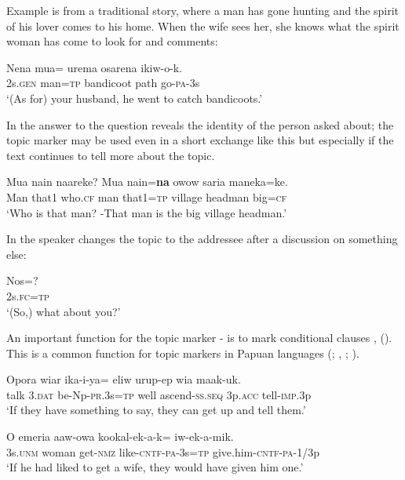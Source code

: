 Example  is from a traditional story, where a man has gone hunting and the spirit of his lover comes to his home. When the wife sees her, she knows what the spirit woman has come to look for and comments:

\ea%
\label{ex:3:x779}
\gll Nena mua= urema osarena ikiw-o-k. \\
2s.\textsc{gen} man=\textsc{tp} bandicoot path go-\textsc{pa}-3s\\
\glt`(As for) your husband, he went to catch bandicoots.'
\z

In  the answer to the question reveals the identity of the person asked about; the topic marker may be used even in a short exchange like this but especially if the text continues to tell more about the topic. 

\ea%
\label{ex:3:x1751}
\gll Mua nain naareke? Mua nain=\textbf{na} owow saria maneka=ke. \\
Man that1 who.\textsc{cf} man that1=\textsc{tp} village headman big=\textsc{cf}\\
\glt`Who is that man? -That man is the big village headman.'
\z

In  the speaker changes the topic to the addressee after a discussion on something else:

\ea%
\label{ex:3:x780}
\gll Nos=? \\
2s.\textsc{fc}=\textsc{tp}\\
\glt`(So,) what about you?'
\z

An important function for the topic marker - is to mark conditional clauses ,  (). This is a common function for topic markers in Papuan languages (\citealt{Haiman1978}; \citealt{Reesink1983b}, \citeyear[242]{Reesink1987}; \citealt[203]{Foley1986}).

\ea%
\label{ex:3:x744}
\gll Opora wiar ika-i-ya= eliw urup-ep wia maak-uk.\\
talk 3.\textsc{dat} be-Np-\textsc{pr}.3s=\textsc{tp} well ascend-\textsc{ss}.\textsc{seq} 3p.\textsc{acc} tell-\textsc{imp}.3p\\
\glt`If they have something to say, they can get up and tell them.'
\z

\ea%
\label{ex:3:x745}
\gll O emeria aaw-owa kookal-ek-a-k= iw-ek-a-mik.\\
3s.\textsc{unm} woman get-\textsc{nmz} like-\textsc{cntf}-\textsc{pa}-3s=\textsc{tp} give.him-\textsc{cntf}-\textsc{pa}-1/3p\\
\glt`If he had liked to get a wife, they would have given him one.'
\z


